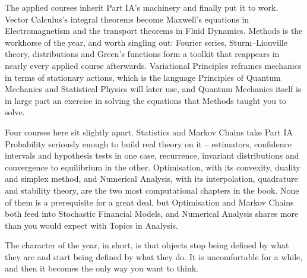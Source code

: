 The applied courses inherit Part IA's machinery and finally put it to work. Vector
Calculus's integral theorems become Maxwell's equations in Electromagnetism and the
transport theorems in Fluid Dynamics. Methods is the workhorse of the year, and worth
singling out: Fourier series, Sturm--Liouville theory, distributions and Green's
functions form a toolkit that reappears in nearly every applied course afterwards.
Variational Principles reframes mechanics in terms of stationary actions, which is the
language Principles of Quantum Mechanics and Statistical Physics will later use, and
Quantum Mechanics itself is in large part an exercise in solving the equations that
Methods taught you to solve.

Four courses here sit slightly apart. Statistics and Markov Chains take Part IA
Probability seriously enough to build real theory on it -- estimators, confidence
intervals and hypothesis tests in one case, recurrence, invariant distributions and
convergence to equilibrium in the other. Optimisation, with its convexity, duality and
simplex method, and Numerical Analysis, with its interpolation, quadrature and
stability theory, are the two most computational chapters in the book. None of them is
a prerequisite for a great deal, but Optimisation and Markov Chains both feed into
Stochastic Financial Models, and Numerical Analysis shares more than you would expect
with Topics in Analysis.

The character of the year, in short, is that objects stop being defined by what they
are and start being defined by what they do. It is uncomfortable for a while, and then
it becomes the only way you want to think.
